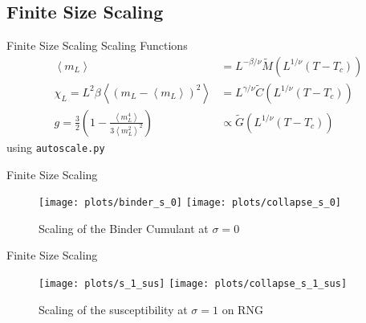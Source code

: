 \documentclass{beamer}
\newcommand{\brac}[1]{\ensuremath{\left(#1\right)}}
\newcommand{\avg}[1]{\left< #1 \right>}
\begin{document}
    \subsection{Finite Size Scaling}
        \begin{frame}{Finite Size Scaling}
            Scaling Functions
            \begin{align}
                \label{eq:fsscaling:m}
                \avg{m_L}                                                              &= L^{-{\beta/\nu}} \tilde{M}\brac{L^{1/\nu}\brac{T-T_c}}\\
                \label{eq:fsscaling:chi}
                \chi_L    = L^{2} \beta \avg{\brac{m_{L}-\avg{m_{L}}}^2}               &= L^{{\gamma/\nu}} \tilde{C}\brac{L^{1/\nu}\brac{T-T_c}}\\
                \label{eq:fsscaling:g}
                g         = \frac{3}{2}\brac{1-\frac{\avg{m_{L}^4}}{3\avg{m_{L}^2}^2}} &\propto \tilde{G}\brac{L^{1/\nu}\brac{T-T_c}}
            \end{align}
            using \texttt{autoscale.py} \cite{autoscale2009}
        \end{frame}
        \begin{frame}{Finite Size Scaling}
            \begin{figure}[htbp]
                \centering
                \subfigure
                {
                    \label{sfig:gettingCrit:binder_s_0}
                    \texttt{[image: plots/binder\_s\_0]}
                }
                \subfigure
                {
                    \label{sfig:gettingCrit:collapse_s_0}
                    \texttt{[image: plots/collapse\_s\_0]}
                }
                \caption
                {
                    Scaling of the Binder Cumulant at \(\sigma = 0\)
                }
                \label{fig:gettingCrit}
            \end{figure}
        \end{frame}
        \begin{frame}{Finite Size Scaling}
            \begin{figure}[htbp]
                \centering
                \subfigure
                {
                    \label{sfig:gettingCrit:s_1_sus}
                    \texttt{[image: plots/s\_1\_sus]}
                }
                \subfigure
                {
                    \label{sfig:gettingCrit:collapse_s_1_sus}
                    \texttt{[image: plots/collapse\_s\_1\_sus]}
                }
                \caption
                {
                    Scaling of the susceptibility at \(\sigma = 1\) on RNG
                }
                \label{fig:gettingCrit}
            \end{figure}
        \end{frame}
\end{document}
